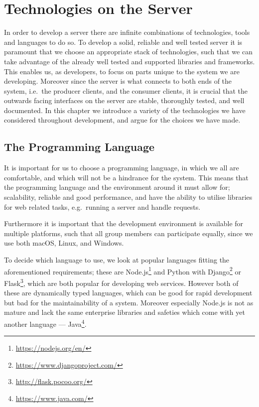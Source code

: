 \chapter{Technologies on the Server}\label{cha:techstack}
In order to develop a server there are infinite combinations of technologies, tools and languages to do so.
To develop a solid, reliable and well tested server it is paramount that we choose an appropriate stack of technologies, such that we can take advantage of the already well tested and supported libraries and frameworks.
This enables us, as developers, to focus on parts unique to the system we are developing.
Moreover since the server is what connects to both ends of the system, i.e.~the producer clients, and the consumer clients, it is crucial that the outwards facing interfaces on the server are stable, thoroughly tested, and well documented.
In this chapter we introduce a variety of the technologies we have considered throughout development, and argue for the choices we have made.

\section{The Programming Language}
It is important for us to choose a programming language, in which we all are comfortable, and which will not be a hindrance for the system.
This means that the programming language and the environment around it must allow for; scalability, reliable and good performance, and have the ability to utilise libraries for web related tasks, e.g.~running a server and handle requests.

Furthermore it is important that the development environment is available for multiple platforms, such that all group members can participate equally, since we use both macOS, Linux, and Windows.

\bigskip
To decide which language to use, we look at popular languages fitting the aforementioned requirements;
these are Node.js\footnote{\url{https://nodejs.org/en/}} and Python with Django\footnote{\url{https://www.djangoproject.com/}} or Flask\footnote{\url{http://flask.pocoo.org/}}, which are both popular for developing web services.
However both of these are dynamically typed languages, which can be good for rapid development but bad for the maintainability of a system\cite{kleinschmager2012static}.
Moreover especially Node.js is not as mature and lack the same enterprise libraries and safeties which come with yet another language --- Java\footnote{\url{https://www.java.com/}}.

